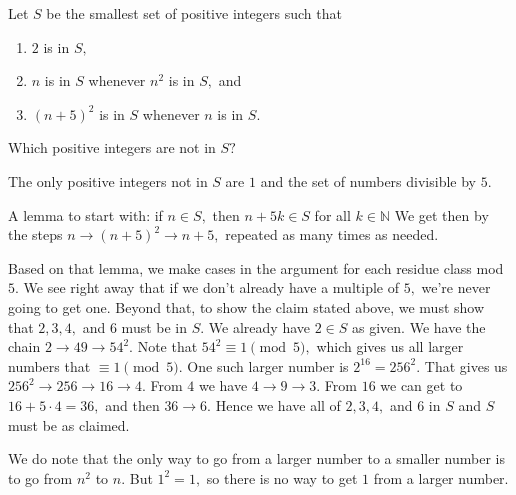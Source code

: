 \documentclass[
  letterpaper,
  DIV=11,
  numbers=noendperiod]{scrreprt}
\providecommand{\tightlist}{%
  \setlength{\itemsep}{0pt}\setlength{\parskip}{0pt}}\usepackage{longtable,booktabs,array}
\begin{document}
\begin{tcolorbox}[enhanced jigsaw, breakable, rightrule=.15mm, opacityback=0, toptitle=1mm, colframe=quarto-callout-note-color-frame, bottomrule=.15mm, toprule=.15mm, leftrule=.75mm, colbacktitle=quarto-callout-note-color!10!white, bottomtitle=1mm, coltitle=black, titlerule=0mm, colback=white, title=\textcolor{quarto-callout-note-color}{\faInfo}\hspace{0.5em}{Smallest Set of integers}, left=2mm, arc=.35mm, opacitybacktitle=0.6]

Let \(S\) be the smallest set of positive integers such that

\begin{enumerate}
\def\labelenumi{\alph{enumi})}
\tightlist
\item
  \(2\) is in \(S,\)
\item
  \(n\) is in \(S\) whenever \(n^2\) is in \(S,\) and
\item
  \((n+5)^2\) is in \(S\) whenever \(n\) is in \(S.\)
\end{enumerate}

Which positive integers are not in \(S?\)

\begin{tcolorbox}[enhanced jigsaw, breakable, rightrule=.15mm, opacityback=0, toptitle=1mm, colframe=quarto-callout-tip-color-frame, bottomrule=.15mm, toprule=.15mm, leftrule=.75mm, colbacktitle=quarto-callout-tip-color!10!white, bottomtitle=1mm, coltitle=black, titlerule=0mm, colback=white, title=\textcolor{quarto-callout-tip-color}{\faLightbulb}\hspace{0.5em}{Text Solution}, left=2mm, arc=.35mm, opacitybacktitle=0.6]

The only positive integers not in \(S\) are \(1\) and the set of numbers
divisible by \(5.\)

A lemma to start with: if \(n\in S,\) then \(n+5k\in S\) for all
\(k\in\mathbb{N}\) We get then by the steps \(n\to (n+5)^2\to n+5,\)
repeated as many times as needed.

Based on that lemma, we make cases in the argument for each residue
class mod \(5.\) We see right away that if we don't already have a
multiple of \(5,\) we're never going to get one. Beyond that, to show
the claim stated above, we must show that \(2,3,4,\) and \(6\) must be
in \(S.\) We already have \(2\in S\) as given. We have the chain
\(2\to 49\to 54^2.\) Note that \(54^2\equiv 1\pmod{5},\) which gives us
all larger numbers that \(\equiv 1\pmod{5}.\) One such larger number is
\(2^{16}=256^2.\) That gives us \(256^2\to 256 \to 16\to 4.\) From \(4\)
we have \(4\to 9\to 3.\) From \(16\) we can get to \(16+5\cdot 4=36,\)
and then \(36\to 6.\) Hence we have all of \(2,3,4,\) and \(6\) in \(S\)
and \(S\) must be as claimed.

We do note that the only way to go from a larger number to a smaller
number is to go from \(n^2\) to \(n.\) But \(1^2=1,\) so there is no way
to get \(1\) from a larger number.

\end{tcolorbox}

\end{tcolorbox}
\end{document}
